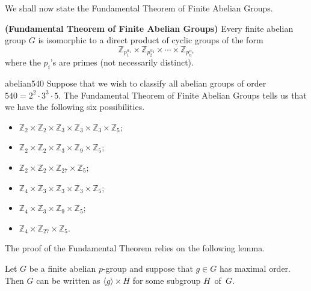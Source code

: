  
\medskip

We shall now state the Fundamental Theorem of Finite Abelian Groups. 
 
 
\begin{theorem}\label{struct:Finite_Abelian_Grps_Theorem}
{\bf (Fundamental Theorem of Finite Abelian
Groups)} 
Every finite abelian group $G$ is isomorphic to a direct product of
cyclic groups of the form 
\[
{\mathbb Z}_{p_1^{ \alpha_1 }}
\times
{\mathbb Z}_{p_2^{ \alpha_2 }}
\times
\cdots
\times
{\mathbb Z}_{p_n^{ \alpha_n }}
\]
where the $p_i$'s are primes (not necessarily distinct).
\end{theorem}
 
 
\begin{example}{abelian540}
Suppose that we wish to classify all abelian groups of order $540=2^2
\cdot 3^3 \cdot 5$.  The Fundamental Theorem of Finite Abelian Groups 
tells us that we have the following six possibilities.
\begin{itemize}
 
\item
${\mathbb Z}_2 \times {\mathbb Z}_2 \times {\mathbb Z}_3
\times {\mathbb Z}_3 \times {\mathbb Z}_3 \times {\mathbb Z}_5$;
 
\item
${\mathbb Z}_2 \times {\mathbb Z}_2 \times {\mathbb Z}_3
\times {\mathbb Z}_9 \times {\mathbb Z}_5$;
 
 
\item
${\mathbb Z}_2 \times {\mathbb Z}_2
\times {\mathbb Z}_{27} \times {\mathbb Z}_5$;
 
 
\item
${\mathbb Z}_4 \times {\mathbb Z}_3
\times {\mathbb Z}_3 \times {\mathbb Z}_3 \times {\mathbb Z}_5$;
 
\item
${\mathbb Z}_4 \times {\mathbb Z}_3
\times {\mathbb Z}_9 \times {\mathbb Z}_5$;
 
\item
${\mathbb Z}_4 \times {\mathbb Z}_{27} \times {\mathbb Z}_5$.
 
\end{itemize}
\end{example}
 
The  proof of the Fundamental Theorem relies on the following lemma.

\begin{lemma}\label{struct:lemma:finite_abelian}
Let $G$ be a finite abelian $p$-group and suppose that $g \in G$ has
maximal order. Then $G$ can be written as $\langle g \rangle \times H$
for some subgroup $H$~of~$G$. 
\end{lemma}
 
